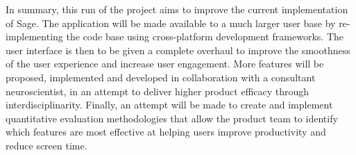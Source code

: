 In summary, this run of the project aims to improve the current implementation of Sage. The application will be made available to a much larger user base by re-implementing the code base using cross-platform development frameworks. The user interface is then to be given a complete overhaul to improve the smoothness of the user experience and increase user engagement. More features will be proposed, implemented and developed in collaboration with a consultant neuroscientist, in an attempt to deliver higher product efficacy through interdisciplinarity. Finally, an attempt will be made to create and implement quantitative evaluation methodologies that allow the product team to identify which features are most effective at helping users improve productivity and reduce screen time.